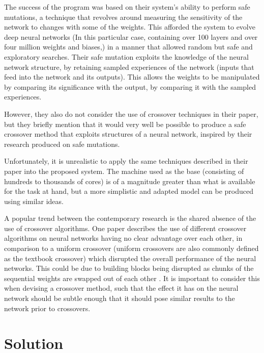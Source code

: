 \documentclass[12pt,a4paper]{article}
\begin{document}
        The success of the program was based on their system's ability to perform safe mutations, a technique that revolves around measuring the sensitivity of the network to changes with some of the weights. \cite{lehman_safe_2017} This afforded the system to evolve deep neural networks (In this particular case, containing over 100 layers and over four million weights and biases,) in a manner that allowed random but safe and exploratory searches. Their safe mutation exploits the knowledge of the neural network structure, by retaining sampled experiences of the network (inputs that feed into the network and its outputs). This allows the weights to be manipulated by comparing its significance with the output, by comparing it with the sampled experiences. 

        However, they also do not consider the use of crossover techniques in their paper, but they briefly mention that it would very well be possible to produce a safe crossover method that exploits structures of a neural network, inspired by their research produced on safe mutations.

        Unfortunately, it is unrealistic to apply the same techniques described in their paper into the proposed system. The machine used as the base (consisting of hundreds to thousands of cores) is of a magnitude greater than what is available for the task at hand, but a more simplistic and adapted model can be produced using similar ideas. 
        
        A popular trend between the contemporary research is the shared absence of the use of crossover algorithms. One paper describes the use of different crossover algorithms on neural networks having no clear advantage over each other, in comparison to a uniform crossover (uniform crossovers are also commonly defined as the textbook crossover) which disrupted the overall performance of the neural networks. This could be due to building blocks being disrupted as chunks of the sequential weights are swapped out of each other \cite{emmanouilidis_comparison_2000}. It is important to consider this when devising a crossover method, such that the effect it has on the neural network should be subtle enough that it should pose similar results to the network prior to crossovers.

\section{Solution}
\end{document}
